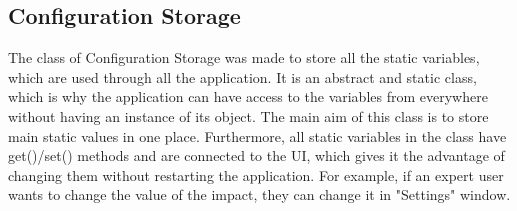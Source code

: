 \documentclass[hidelinks,conference,12pt]{IEEETran}
\begin{document}
\subsection{Configuration Storage}
The class of Configuration Storage was made to store all the static variables, which are used through all the application. It is an abstract and static class, which is why the application can have access to the variables from everywhere without having an instance of its object. The main aim of this class is to store main static values in one place. Furthermore, all static variables in the class have get()/set() methods and are connected to the UI, which gives it the advantage of changing them without restarting the application. For example, if an expert user wants to change the value of the impact, they can change it in "Settings" window.
\end{document}
